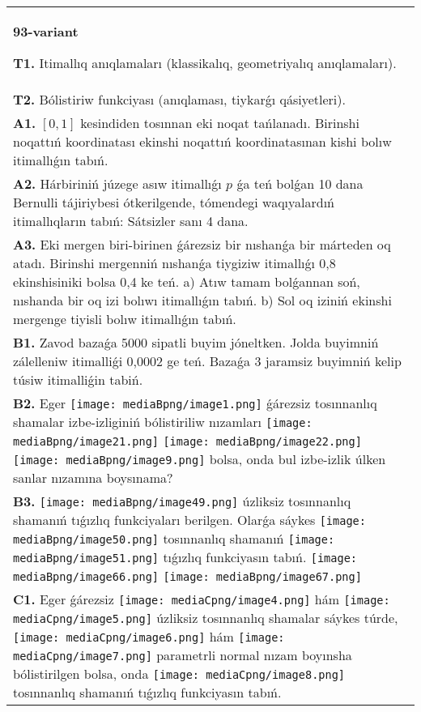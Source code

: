 \documentclass{article}
\begin{document}
\begin{tabular}{m{17cm}}
\textbf{93-variant}
\newline

\textbf{T1.} Itimallıq anıqlamaları (klassikalıq, geometriyalıq anıqlamaları).
 \\
\textbf{T2.} Bólistiriw funkciyası (anıqlaması, tiykarǵı qásiyetleri).
 \\
\textbf{A1.} $\left[ 0,1 \right]$ kesindiden tosınnan eki noqat tańlanadı. Birinshi noqattıń koordinatası ekinshi noqattıń koordinatasınan kishi bolıw itimallıǵın tabıń.
 \\
\textbf{A2.} Hárbiriniń júzege asıw itimallıǵı $p$ ǵa teń bolǵan 10 dana Bernulli tájiriybesi ótkerilgende, tómendegi waqıyalardıń itimallıqların tabıń: Sátsizler sanı 4 dana.
 \\
\textbf{A3.} Eki mergen biri-birinen ǵárezsiz bir nıshanǵa bir márteden oq atadı. Birinshi mergenniń nıshanǵa tiygiziw itimallıǵı 0,8 ekinshisiniki bolsa 0,4 ke teń. a) Atıw tamam bolǵannan soń, nıshanda bir oq izi bolıwı itimallıǵın tabıń. b) Sol oq iziniń ekinshi mergenge tiyisli bolıw itimallıǵın tabıń.
 \\
\textbf{B1.} Zavod bazaǵa 5000 sipatli buyim jóneltken. Jolda buyimniń zálelleniw itimalliǵi 0,0002 ge teń. Bazaǵa 3 jaramsiz buyimniń kelip túsiw itimalliǵin tabiń.
 \\
\textbf{B2.} Eger \texttt{[image: mediaBpng/image1.png]} ǵárezsiz tosınnanlıq shamalar izbe-izliginiń bólistiriliw nızamları
\texttt{[image: mediaBpng/image21.png]} \texttt{[image: mediaBpng/image22.png]} \texttt{[image: mediaBpng/image9.png]}
bolsa, onda bul izbe-izlik úlken sanlar nızamına boysınama?
 \\
\textbf{B3.} \texttt{[image: mediaBpng/image49.png]} úzliksiz tosınnanlıq shamanıń tıǵızlıq funkciyaları berilgen. Olarǵa sáykes \texttt{[image: mediaBpng/image50.png]} tosınnanlıq shamanıń \texttt{[image: mediaBpng/image51.png]} tıǵızlıq funkciyasın tabıń. \texttt{[image: mediaBpng/image66.png]} \texttt{[image: mediaBpng/image67.png]}
 \\
\textbf{C1.} Eger ǵárezsiz \texttt{[image: mediaCpng/image4.png]} hám \texttt{[image: mediaCpng/image5.png]} úzliksiz tosınnanlıq shamalar sáykes túrde, \texttt{[image: mediaCpng/image6.png]} hám \texttt{[image: mediaCpng/image7.png]} parametrli normal nızam boyınsha bólistirilgen bolsa, onda \texttt{[image: mediaCpng/image8.png]} tosınnanlıq shamanıń tıǵızlıq funkciyasın tabıń.

\end{tabular}
\end{document}
